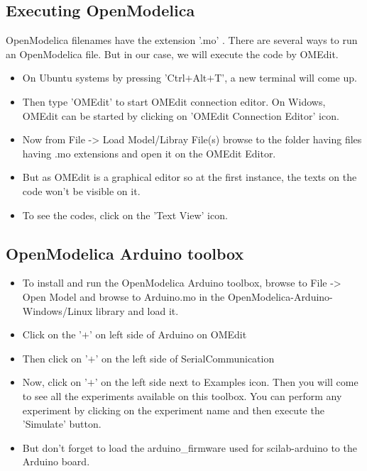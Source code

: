 \subsection{Executing OpenModelica}\label{OpenModelica-code-execution}
OpenModelica filenames have the extension '.mo' . There are several ways to run an OpenModelica file.
But in our case, we will execute the code by OMEdit.

\begin{itemize}
      \item On Ubuntu systems by pressing 'Ctrl$+$Alt$+$T', a new terminal will come up.
      \item Then type 'OMEdit' to start OMEdit connection editor. On Widows, OMEdit can be started by clicking on 'OMEdit Connection Editor' icon.
      \item Now from File -> Load Model/Libray File(s) browse to the folder having files having .mo extensions and open it on the OMEdit Editor.
      \item But as OMEdit is a graphical editor so at the first instance, the texts on the code won't be visible on it.
      \item To see the codes, click on the 'Text View' icon.
\end{itemize}



\subsection{OpenModelica Arduino toolbox}

\begin{itemize}
      \item To install and run the OpenModelica Arduino toolbox, browse to
            File -> Open Model and browse to Arduino.mo in the OpenModelica-Arduino-Windows/Linux library and load it.
      \item Click on the '$+$' on left side of Arduino on OMEdit
      \item Then click on '$+$' on the left side of SerialCommunication
      \item Now, click on '$+$' on the left side next to Examples icon. Then you will come to see all
            the experiments available on this toolbox. You can perform any experiment by clicking on the experiment
            name and then execute the 'Simulate' button. 
      \item But don't forget to load the arduino\_firmware used for scilab-arduino to the Arduino board.
\end{itemize}



